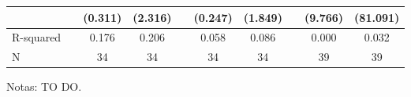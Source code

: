 \begin{table}[h]
{{\begin{threeparttable}
\begin{tabular}{l*{9}{S}}
				&&     (0.311)         &     (2.316)         &&     (0.247)         &     (1.849)         &&     (9.766)         &    (81.091)         \\
				\midrule            
				R-squared           &&       0.176         &       0.206         &&       0.058         &       0.086         &&       0.000         &       0.032         \\
				N                   &&          34         &          34         &&          34         &          34         &&          39         &          39         \\
					\hline \hline
				\end{tabular}
				\begin{tablenotes}
					\footnotesize{Notas: TO DO.}
				\end{tablenotes}
			\end{threeparttable}
		}
	}
\end{table}

